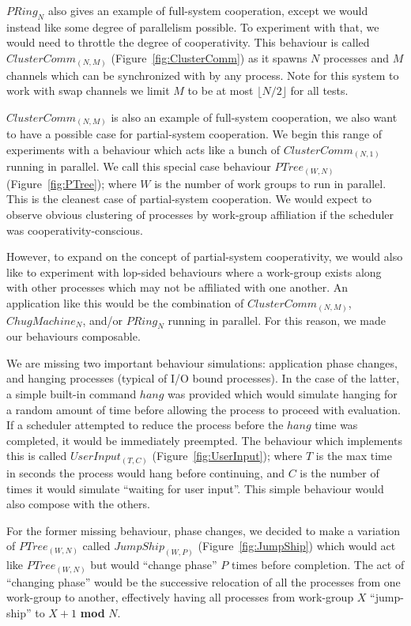 $PRing_N$ also gives an example of full-system cooperation, except we would 
instead like some degree of parallelism possible. To experiment with that, we 
would need to throttle the degree of cooperativity. This behaviour is called
$ClusterComm_{(N,M)}$ (Figure~\ref{fig:ClusterComm}) as it spawns $N$ processes and $M$ channels which can be
synchronized with by any process. Note for this system to work with swap 
channels we limit $M$ to be at most $\lfloor N/2 \rfloor$ for all tests. 

$ClusterComm_{(N,M)}$ is also an example of full-system cooperation, we also
want to have a possible case for partial-system cooperation. We begin this range
of experiments with a behaviour which acts like a bunch of $ClusterComm_{(N,1)}$
running in parallel. We call this special case behaviour $PTree_{(W,N)}$ (Figure~\ref{fig:PTree}); where $W$ is 
the number of work groups to run in parallel. This is the cleanest case of 
partial-system cooperation. We would expect to observe obvious clustering of 
processes by work-group affiliation if the scheduler was 
cooperativity-conscious.

However, to expand on the concept of partial-system cooperativity, we would 
also like to experiment with lop-sided behaviours where a work-group exists 
along with other processes which may not be affiliated with one another. An 
application like this would be the combination of $ClusterComm_{(N,M)}$, 
$ChugMachine_N$, and/or $PRing_N$ running in parallel. For this reason, we made
our behaviours composable.

We are missing two important behaviour simulations: application phase changes,
and hanging processes (typical of I/O bound processes). In the case of the 
latter, a simple built-in command $hang$ was provided which would simulate 
hanging for a random amount of time before allowing the process to proceed with
evaluation. If a scheduler attempted to reduce the process before the $hang$ 
time was completed, it would be immediately preempted. The behaviour which 
implements this is called $UserInput_{(T,C)}$ (Figure~\ref{fig:UserInput}); where $T$ is the max time in seconds
the process would hang before continuing, and $C$ is the number of times it 
would simulate ``waiting for user input''. This simple behaviour would also
compose with the others.

For the former missing behaviour, phase changes, we decided to make a variation
of $PTree_{(W,N)}$ called $JumpShip_{(W,P)}$ (Figure~\ref{fig:JumpShip}) which would act like $PTree_{(W,N)}$ but would
``change phase'' $P$ times before completion. The act of ``changing phase'' would 
be the successive relocation of all the processes from one work-group to 
another, effectively having all processes from work-group $X$ ``jump-ship'' to
$X+1$ \textbf{mod} $N$.

